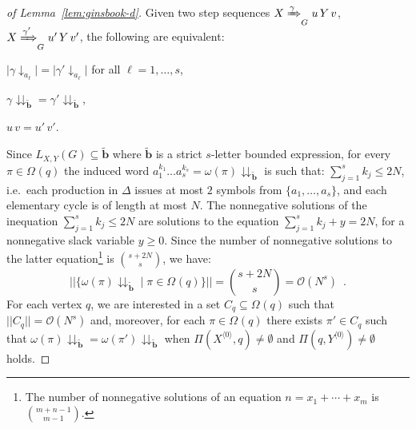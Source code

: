 \documentclass[final]{llncs}
\def\tuple#1{{\langle #1 \rangle}}
\def\card#1{{|\!|{#1}|\!|}}
\def\len#1{{\vert{#1}\vert}}
\def\prod{\Delta}
\def\patt{{\widetilde{\mathbf{b}}}}
\newcommand{\cycles}[2]{\Omega_{{#1}}({#2})}
\def\proj{\mathbin{\downarrow}}
\renewcommand{\proj}[2]{{#1}\mathclose{\downarrow}_{{#2}}}
\newcommand{\projpatt}[1]{{#1}\mathclose{\downdownarrows}_{{\patt}}}
\begin{document}
\begin{proof}[of Lemma~\ref{lem:ginsbook-d}]
Given two step sequences $X \xRightarrow{\gamma}_G u \, Y \, v$,
$X \xRightarrow{\gamma'}_G u' \, Y \, v'$, the following are equivalent:
\begin{compactitem}
\item \( \len{\proj{\gamma}{a_{\ell}}} = \len{\proj{\gamma'}{a_{\ell}}} \) for all \(\ell=1,\ldots,s\),
\item \( \projpatt{\gamma} = \projpatt{\gamma'}\),
\item \( u\, v = u'\, v'\).
\end{compactitem}
Since \(L_{X,Y}(G) \subseteq \patt\) where \(\patt\) is a
strict \(s\)-letter bounded expression, for
every \(\pi \in \cycles{}{q}\) the induced word $a_1^{k_1} \ldots
a_s^{k_s} = \projpatt{\omega(\pi)}$ is such that: $\sum_{j=1}^s
k_{j} \leq 2N$, i.e.\ each production in $\prod$ issues at most $2$
symbols from $\{a_1,\ldots,a_s\}$, and each elementary cycle is of
length at most $N$. The nonnegative solutions of the inequation
$\sum_{j=1}^s k_{j} \leq 2N$ are solutions to the equation
$\sum_{j=1}^s k_{j} + y = 2N$, for a nonnegative slack variable
$y \geq 0$. Since the number of nonnegative solutions to the latter
equation\footnote{The number of nonnegative solutions of an equation
$n=x_1+\cdots+x_m$ is $\binom{m+n-1}{m-1}$.} is $\binom{s+2N}{s}$, we
have:
\begin{equation}\label{eq:binom}
	\card{ \{ \projpatt{\omega(\pi)} \mid \pi \in \cycles{}{q}\} } = \binom{s+2N}{s} = \mathcal{O}(N^s)\enspace .
\end{equation}
For each vertex \(q\), we are interested in a
set \(C_q \subseteq \cycles{}{q}\) such that \(\card{C_q}
= \mathcal{O}(N^{s})\) and,
moreover, for each \(\pi\in\cycles{}{q}\) there exists \(\pi' \in C_q\) such that
\(\projpatt{\omega(\pi)} = \projpatt{\omega(\pi')}\)
when
\(\Pi(X^{\tuple{0}},q) \neq \emptyset\) and \(\Pi(q, Y^{\tuple{0}}) \neq \emptyset\) holds.


\end{proof}
\end{document}
